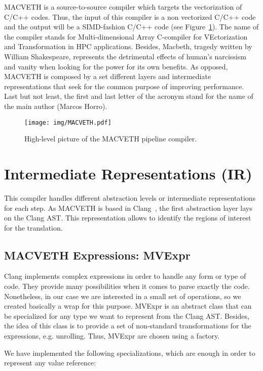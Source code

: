 \documentclass[a4paper,12pt]{memoir}
\begin{document}
MACVETH is a source-to-source compiler which targets the vectorization of C/C++ 
codes. Thus, the input of this compiler is a non vectorized C/C++ code and the 
output will be a SIMD-fashion C/C++ code (see Figure~\ref{fig:MACVETHarch}). 
The name of the compiler stands for Multi-dimensional Array C-compiler for 
VEctorization and Transformation in HPC applications. Besides, Macbeth, tragedy 
written by William Shakespeare, represents the detrimental effects of human's 
narcissism and vanity when looking for the power for its own benefits. As 
opposed, MACVETH is composed by a set different layers and intermediate 
representations that seek for the common purpose of improving performance. Last 
but not least, the first and last letter of the acronym stand for the name of 
the main author (Marcos Horro).

\begin{figure}
	\centering
	\texttt{[image: img/MACVETH.pdf]}
	\caption{High-level picture of the MACVETH pipeline compiler.}
	\label{fig:MACVETHarch}
\end{figure}

\chapter{Intermediate Representations (IR)}



This compiler handles different abstraction levels or intermediate
representations for each step. As MACVETH is based in Clang~\cite{bib:clang},
the first abstraction layer lays on the Clang AST. This representation allows to
identify the regions of interest for the translation.

\section{MACVETH Expressions: MVExpr}
Clang implements complex expressions in order to handle any form or type of 
code. They 
provide many possibilities
when it comes to parse exactly the code. Nonetheless, in our case we are
interested in a small set of operations, so we created basically a wrap for this
purpose. MVExpr is an abstract class that can be specialized for any type we
want to represent from the Clang AST. Besides, the idea of this class is to
provide a set of non-standard transformations for the expressions, e.g.
unrolling. Thus, MVExpr are chosen using a factory.

We have implemented the following specializations, which are enough in order to 
represent any value reference:
\end{document}
